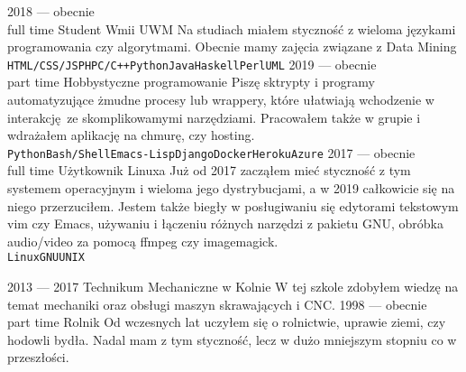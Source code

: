 \documentclass[9pt]{developercv} %
\begin{document}
\begin{entrylist}
    \entry
    {2018 --- obecnie\\\footnotesize{full time}}
    {Student}
    {Wmii UWM}
    {Na studiach miałem styczność z wieloma językami programowania czy algorytmami. Obecnie mamy zajęcia związane z Data Mining\\ \texttt{HTML/CSS/JS}\slashsep\texttt{PHP}\slashsep\texttt{C/C++}\slashsep\texttt{Python}\slashsep\texttt{Java}\slashsep\texttt{Haskell}\slashsep\texttt{Perl}\slashsep\texttt{UML}}
    \entry
    {2019 --- obecnie\\\footnotesize{part time}}
    {Hobbystyczne programowanie}
    {}
    {Piszę sktrypty i programy automatyzujące żmudne procesy lub wrappery, które ułatwiają wchodzenie w interakcję ze skomplikowamymi narzędziami. Pracowałem także w grupie i wdrażałem aplikację na chmurę, czy hosting.\\ \texttt{Python}\slashsep\texttt{Bash/Shell}\slashsep\texttt{Emacs-Lisp}\slashsep\texttt{Django}\slashsep\texttt{Docker}\slashsep\texttt{Heroku}\slashsep\texttt{Azure}}
    \entry
    {2017 --- obecnie\\\footnotesize{full time}}
    {Użytkownik Linuxa}
    {}
    {Już od 2017 zacząłem mieć styczność z tym systemem operacyjnym i wieloma jego dystrybucjami, a w 2019 całkowicie się na niego przerzuciłem. Jestem także biegły w posługiwaniu się edytorami tekstowym vim czy Emacs, używaniu i łączeniu różnych narzędzi z pakietu GNU, obróbka audio/video za pomocą ffmpeg czy imagemagick.\\ \texttt{Linux}\slashsep\texttt{GNU}\slashsep\texttt{UNIX}}
\end{entrylist}



\begin{entrylist}
    \entry
    {2013 --- 2017}
    {Technikum Mechaniczne w Kolnie}
    {}
    {W tej szkole zdobyłem wiedzę na temat mechaniki oraz obsługi maszyn skrawających i CNC.}
    \entry
    {1998 --- obecnie\\\footnotesize{part time}}
    {Rolnik}
    {}
    {Od wczesnych lat uczyłem się o rolnictwie, uprawie ziemi, czy hodowli bydła. Nadal mam z tym styczność, lecz w dużo mniejszym stopniu co w przeszłości.}
\end{entrylist}
\end{document}
